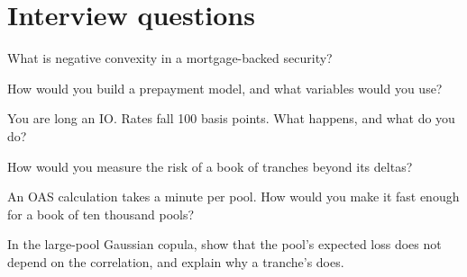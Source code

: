 \section{Interview questions}

\begin{interviewq}\label{iq:s2:mortgage-and-structured-credit-strategies:1}
What is negative convexity in a mortgage-backed security?
\end{interviewq}

\begin{interviewq}\label{iq:s2:mortgage-and-structured-credit-strategies:2}
How would you build a prepayment model, and what variables would you use?
\end{interviewq}

\begin{interviewq}\label{iq:s2:mortgage-and-structured-credit-strategies:3}
You are long an IO. Rates fall 100 basis points. What happens, and what do you do?
\end{interviewq}

\begin{interviewq}\label{iq:s2:mortgage-and-structured-credit-strategies:4}
How would you measure the risk of a book of tranches beyond its deltas?
\end{interviewq}

\begin{interviewq}\label{iq:s2:mortgage-and-structured-credit-strategies:5}
An OAS calculation takes a minute per pool. How would you make it fast enough for a book of ten thousand pools?
\end{interviewq}

\begin{interviewq}\label{iq:s2:mortgage-and-structured-credit-strategies:6}
In the large-pool Gaussian copula, show that the pool's expected loss does not depend on the correlation, and explain why a tranche's does.
\end{interviewq}
